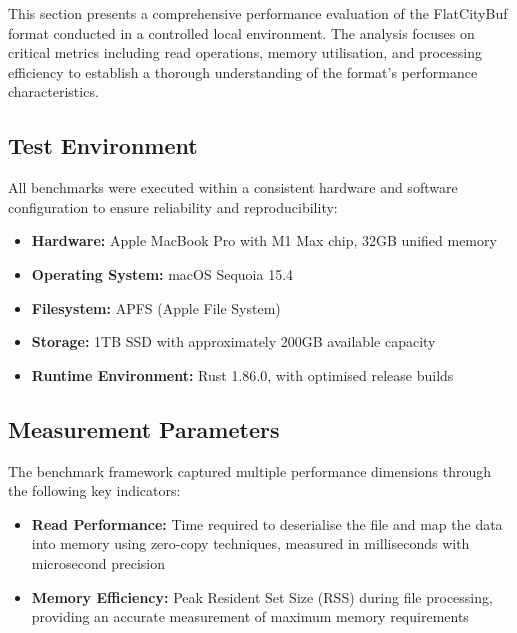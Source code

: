 This section presents a comprehensive performance evaluation of the FlatCityBuf format conducted in a controlled local environment. The analysis focuses on critical metrics including read operations, memory utilisation, and processing efficiency to establish a thorough understanding of the format's performance characteristics.

\subsection{Test Environment}
\label{result:benchmark_on_local_environment:test_environment}

All benchmarks were executed within a consistent hardware and software configuration to ensure reliability and reproducibility:

\begin{itemize}
  \item \textbf{Hardware:} Apple MacBook Pro with M1 Max chip, 32GB unified memory
  \item \textbf{Operating System:} macOS Sequoia 15.4
  \item \textbf{Filesystem:} APFS (Apple File System)
  \item \textbf{Storage:} 1TB SSD with approximately 200GB available capacity
  \item \textbf{Runtime Environment:} Rust 1.86.0, with optimised release builds
\end{itemize}

\subsection{Measurement Parameters}
\label{result:benchmark_on_local_environment:measurement_parameters}

The benchmark framework captured multiple performance dimensions through the following key indicators:

\begin{itemize}
  \item \textbf{Read Performance:} Time required to deserialise the file and map the data into memory using zero-copy techniques, measured in milliseconds with microsecond precision

  \item \textbf{Memory Efficiency:} Peak Resident Set Size (RSS) during file processing, providing an accurate measurement of maximum memory requirements

\end{itemize}


